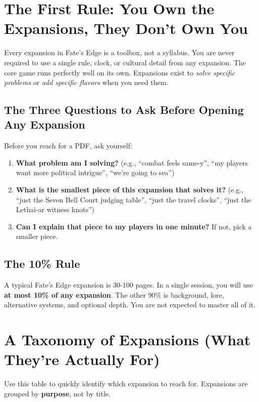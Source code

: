 \section{The First Rule: You Own the Expansions, They Don't Own You}

Every expansion in Fate's Edge is a toolbox, not a syllabus. You are never required to use a single rule, clock, or cultural detail from any expansion. The core game runs perfectly well on its own. Expansions exist to \emph{solve specific problems} or \emph{add specific flavors} when you need them.

\subsection{The Three Questions to Ask Before Opening Any Expansion}

Before you reach for a PDF, ask yourself:

\begin{enumerate}
\item \textbf{What problem am I solving?} (e.g., “combat feels same-y”, “my players want more political intrigue”, “we're going to sea”)
\item \textbf{What is the smallest piece of this expansion that solves it?} (e.g., “just the Seven Bell Court judging table”, “just the travel clocks”, “just the Lethai-ar witness knots”)
\item \textbf{Can I explain that piece to my players in one minute?} If not, pick a smaller piece.
\end{enumerate}

\subsection{The 10\% Rule}

A typical Fate's Edge expansion is 30-100 pages. In a single session, you will use \textbf{at most 10\% of any expansion}. The other 90\% is background, lore, alternative systems, and optional depth. You are not expected to master all of it.

\section{A Taxonomy of Expansions (What They're Actually For)}

Use this table to quickly identify which expansion to reach for. Expansions are grouped by \textbf{purpose}, not by title.

